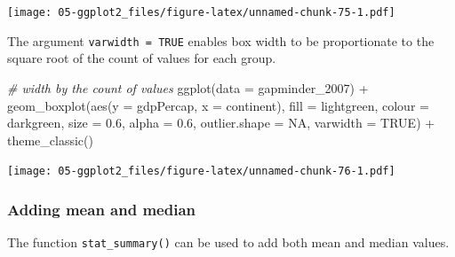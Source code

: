 \documentclass[
]{book}
\newenvironment{Shaded}{\begin{snugshade}}{\end{snugshade}}
\newcommand{\AttributeTok}[1]{\textcolor[rgb]{0.77,0.63,0.00}{#1}}
\newcommand{\CommentTok}[1]{\textcolor[rgb]{0.56,0.35,0.01}{\textit{#1}}}
\newcommand{\ConstantTok}[1]{\textcolor[rgb]{0.00,0.00,0.00}{#1}}
\newcommand{\FloatTok}[1]{\textcolor[rgb]{0.00,0.00,0.81}{#1}}
\newcommand{\FunctionTok}[1]{\textcolor[rgb]{0.00,0.00,0.00}{#1}}
\newcommand{\NormalTok}[1]{#1}
\newcommand{\SpecialCharTok}[1]{\textcolor[rgb]{0.00,0.00,0.00}{#1}}
\newcommand{\StringTok}[1]{\textcolor[rgb]{0.31,0.60,0.02}{#1}}
\begin{document}
\texttt{[image: 05-ggplot2\_files/figure-latex/unnamed-chunk-75-1.pdf]}

The argument \texttt{varwidth\ =\ TRUE} enables box width to be proportionate to the square root of the count of values for each group.

\begin{Shaded}
\begin{Highlighting}[]
\CommentTok{\# width by the count of values}
\FunctionTok{ggplot}\NormalTok{(}\AttributeTok{data =}\NormalTok{ gapminder\_2007) }\SpecialCharTok{+} 
   \FunctionTok{geom\_boxplot}\NormalTok{(}\FunctionTok{aes}\NormalTok{(}\AttributeTok{y =}\NormalTok{ gdpPercap, }\AttributeTok{x =}\NormalTok{ continent), }
                \AttributeTok{fill =} \StringTok{\textquotesingle{}lightgreen\textquotesingle{}}\NormalTok{, }
                \AttributeTok{colour =} \StringTok{\textquotesingle{}darkgreen\textquotesingle{}}\NormalTok{, }
                \AttributeTok{size =} \FloatTok{0.6}\NormalTok{, }
                \AttributeTok{alpha =} \FloatTok{0.6}\NormalTok{,              }
                \AttributeTok{outlier.shape =} \ConstantTok{NA}\NormalTok{, }
                \AttributeTok{varwidth =} \ConstantTok{TRUE}\NormalTok{) }\SpecialCharTok{+}
   \FunctionTok{theme\_classic}\NormalTok{()}
\end{Highlighting}
\end{Shaded}

\texttt{[image: 05-ggplot2\_files/figure-latex/unnamed-chunk-76-1.pdf]}

\hypertarget{adding-mean-and-median}{%
\subsubsection{Adding mean and median}\label{adding-mean-and-median}}

The function \texttt{stat\_summary()} can be used to add both mean and median values.
\end{document}
